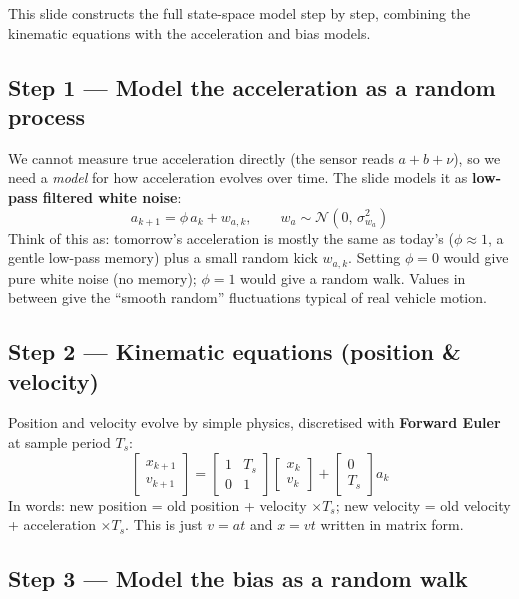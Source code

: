 \documentclass[12pt, a4paper]{article}
\begin{document}
This slide constructs the full state-space model step by step,
combining the kinematic equations with the acceleration and bias
models.

\subsection*{Step 1 --- Model the acceleration as a random process}

We cannot measure true acceleration directly (the sensor reads
$a + b + \nu$), so we need a \emph{model} for how acceleration
evolves over time.
The slide models it as \textbf{low-pass filtered white noise}:
\[
  a_{k+1} = \phi\, a_k + w_{a,k}, \qquad w_a \sim \mathcal{N}(0,\,\sigma_{w_a}^2)
\]
Think of this as: tomorrow's acceleration is mostly the same as
today's ($\phi \approx 1$, a gentle low-pass memory) plus a small
random kick $w_{a,k}$.
Setting $\phi = 0$ would give pure white noise (no memory);
$\phi = 1$ would give a random walk.
Values in between give the ``smooth random'' fluctuations typical of
real vehicle motion.

\subsection*{Step 2 --- Kinematic equations (position \& velocity)}

Position and velocity evolve by simple physics, discretised with
\textbf{Forward Euler} at sample period $T_s$:
\[
  \begin{bmatrix} x_{k+1} \\ v_{k+1} \end{bmatrix}
  =
  \begin{bmatrix} 1 & T_s \\ 0 & 1 \end{bmatrix}
  \begin{bmatrix} x_k \\ v_k \end{bmatrix}
  +
  \begin{bmatrix} 0 \\ T_s \end{bmatrix} a_k
\]
In words: new position = old position + velocity $\times T_s$;
new velocity = old velocity + acceleration $\times T_s$.
This is just $v = at$ and $x = vt$ written in matrix form.

\subsection*{Step 3 --- Model the bias as a random walk}
\end{document}
